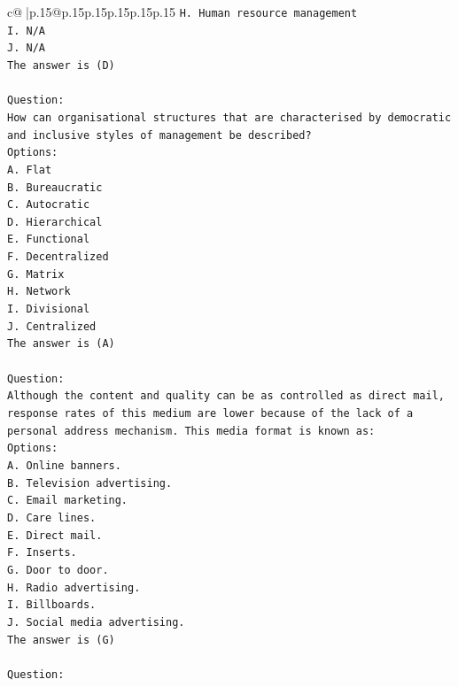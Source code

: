\documentclass{article}
\begin{document}
{\begin{supertabular}{c@{$\;$}|p{.15\linewidth}@{}p{.15\linewidth}p{.15\linewidth}p{.15\linewidth}p{.15\linewidth}p{.15\linewidth}}
{{{\texttt{H. Human resource management} \\
\texttt{I. N/A} \\
\texttt{J. N/A} \\
\texttt{The answer is (D)} \\
\\ 
\texttt{Question:} \\
\texttt{How can organisational structures that are characterised by democratic and inclusive styles of management be described?} \\
\texttt{Options:} \\
\texttt{A. Flat} \\
\texttt{B. Bureaucratic} \\
\texttt{C. Autocratic} \\
\texttt{D. Hierarchical} \\
\texttt{E. Functional} \\
\texttt{F. Decentralized} \\
\texttt{G. Matrix} \\
\texttt{H. Network} \\
\texttt{I. Divisional} \\
\texttt{J. Centralized} \\
\texttt{The answer is (A)} \\
\\ 
\texttt{Question:} \\
\texttt{Although the content and quality can be as controlled as direct mail, response rates of this medium are lower because of the lack of a personal address mechanism. This media format is known as:} \\
\texttt{Options:} \\
\texttt{A. Online banners.} \\
\texttt{B. Television advertising.} \\
\texttt{C. Email marketing.} \\
\texttt{D. Care lines.} \\
\texttt{E. Direct mail.} \\
\texttt{F. Inserts.} \\
\texttt{G. Door to door.} \\
\texttt{H. Radio advertising.} \\
\texttt{I. Billboards.} \\
\texttt{J. Social media advertising.} \\
\texttt{The answer is (G)} \\
\\ 
\texttt{Question:} \\
}}}
\end{supertabular}}
\end{document}
